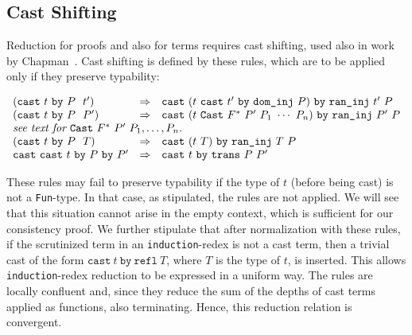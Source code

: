 \documentclass{fundam}
\begin{document}
\subsection{Cast Shifting}
\label{sec:cast-shift}

Reduction for proofs and also for terms requires cast shifting, used
also in work by Chapman~\cite{chapman08}.  Cast shifting is defined by
these rules, which are to be applied only if they preserve typability:

\[
\begin{array}{lll}
(\texttt{cast}\ t\ \texttt{by}\ P\ \ t') & \Rightarrow & \texttt{cast}\ (t\ \texttt{cast}\ t'\ \texttt{by}\ \texttt{dom\_inj}\ P)\ \texttt{by}\ \texttt{ran\_inj}\ t'\ P \\ 
(\texttt{cast}\ t\ \texttt{by}\ P\ \ P') & \Rightarrow & \texttt{cast}\ (t\ \texttt{Cast}\ F^*\ P'\ P_1\ \cdots\ P_n)\ \texttt{by}\ \texttt{ran\_inj}\ P'\ P \\
\multicolumn{3}{l}{\textit{see text for }\texttt{Cast}\ F^*\ P'\ P_1, \ldots, P_n.}\\
(\texttt{cast}\ t\ \texttt{by}\ P\ \ T) & \Rightarrow & \texttt{cast}\ (t\ T)\ \texttt{by}\ \texttt{ran\_inj}\ T\ P \\
\texttt{cast}\ \texttt{cast}\ t\ \texttt{by}\ P\ \texttt{by}\ P' & \Rightarrow & \texttt{cast}\ t\ \texttt{by}\ \texttt{trans}\ P\ P'
\end{array}
\]

\noindent These rules may fail to preserve typability if the type of
$t$ (before being cast) is not a \texttt{Fun}-type.  In that case, as
stipulated, the rules are not applied.  We will see that this
situation cannot arise in the empty context, which is sufficient for
our consistency proof.  We further stipulate that after normalization
with these rules, if the scrutinized term in an
\texttt{induction}-redex is not a cast term, then a trivial cast of
the form $\texttt{cast}\ t\ \texttt{by}\ \texttt{refl}\ T$, where $T$
is the type of $t$, is inserted.  This allows \texttt{induction}-redex
reduction to be expressed in a uniform way.  The rules are locally
confluent and, since they reduce the sum of the depths of cast terms
applied as functions, also terminating.  Hence, this reduction
relation is convergent.
\end{document}
